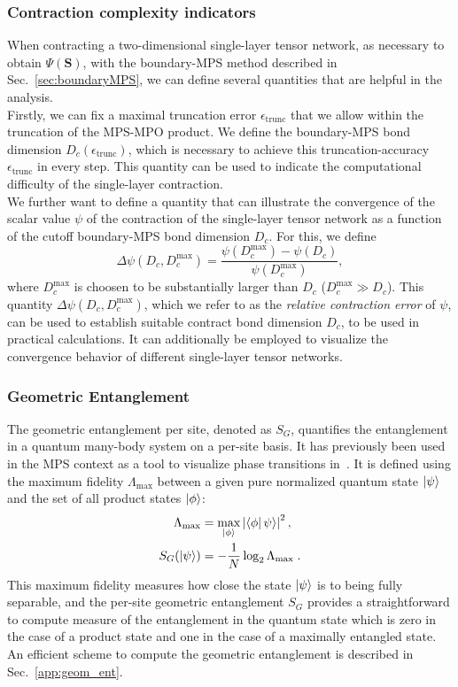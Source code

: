 \documentclass[aps,notitlepage,twocolumn,nofootinbib,superscriptaddress,pra,10pt]{revtex4-2}
\begin{document}
\subsubsection{Contraction complexity indicators}
\label{sec:contr_compl_issues:compl_indicators}
When contracting a two-dimensional single-layer tensor network, as necessary to obtain $\Psi(\textbf{S})$, with the boundary-MPS method described in Sec.~\ref{sec:boundaryMPS}, we can define several quantities that are helpful in the analysis.\\
Firstly, we can fix a maximal truncation error $\epsilon_{\text{trunc}}$ that we allow within the truncation of the MPS-MPO product. 
We define the boundary-MPS bond dimension $D_c(\epsilon_{\text{trunc}})$, which is necessary to achieve this truncation-accuracy $\epsilon_{\text{trunc}}$ in every step. This quantity can be used to indicate the computational difficulty of the single-layer contraction.\\

We further want to define a quantity that can illustrate the convergence of the scalar value $\psi$ of the contraction of the single-layer tensor network as a function of the cutoff boundary-MPS bond dimension $D_c$. For this, we define
\begin{equation}
    \Delta\psi(D_c, D_c^{\max}) = \frac{\psi(D_c^{\max}) - \psi(D_c)}{\psi(D_c^{\max})},
\end{equation}
where $D_c^{\max}$ is choosen to be substantially larger than $D_c$ ($D_c^{\max} \gg D_c$).
This quantity $\Delta\psi(D_c, D_c^{\max})$, which we refer to as the \textit{relative contraction error} of $\psi$, can be used to establish suitable contract bond dimension $D_c$, to be used in practical calculations. It can additionally be employed to visualize the convergence behavior of different single-layer tensor networks. 

\subsubsection{Geometric Entanglement}
\label{sec:geometric_entanglement}
The geometric entanglement per site, denoted as $S_G$, quantifies the entanglement in a quantum many-body system on a per-site basis. It has previously been used in the MPS context as a tool to visualize phase transitions in~\cite{orus2010visualizing}.
%
It is defined using the maximum fidelity $\Lambda_{\max}$ between a given pure normalized quantum state $\ket{\psi}$ and the set of all product states $\ket{\phi}$:
%
\begin{align}
\Lambda_{\max} &= \max_{\ket{\phi}} \left| \bra{\phi} \psi \rangle \right|^2, \nonumber\\
S_G (\ket{\psi}) &= -\frac{1}{N}\log_2 \Lambda_{\max}\;.
\end{align}
%
This maximum fidelity measures how close the state $\ket{\psi}$ is to being fully separable, and the per-site geometric entanglement $S_G$ provides a straightforward to compute measure of the entanglement in the quantum state which is zero in the case of a product state and one in the case of a maximally entangled state. An efficient scheme to compute the geometric entanglement is described in Sec.~\ref{app:geom_ent}.
\end{document}
